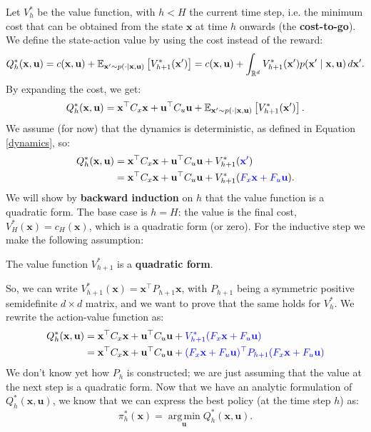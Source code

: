 \documentclass[10pt, a4paper]{report}
\begin{document}
Let $V^*_h$ be the value function, with $h<H$ the current time step, i.e. the minimum cost that can be obtained from the state $\mathbf x$ at time $h$ onwards (the \textbf{cost-to-go}). We define the state-action value by using the cost instead of the reward:\begin{equation}
    Q_h^*(\mathbf x,\mathbf u)=c(\mathbf x,\mathbf u)+{\mathbb E}_{\mathbf x'\sim p(\cdot\mid\mathbf x,\mathbf u)}\left[V_{h+1}^*(\mathbf x')\right]=
    c(\mathbf x,\mathbf u)+\int_{{\mathbb R}^d}V_{h+1}^*(\mathbf x')p(
        \mathbf x'\mid\mathbf x,\mathbf u
    )\,d\mathbf x'.
\end{equation}
By expanding the cost, we get:\begin{equation}
     Q_h^*(\mathbf x,\mathbf u)=\mathbf x^\top C_x\mathbf x+
    \mathbf u^\top C_u\mathbf u+{\mathbb E}_{\mathbf x'\sim p(\cdot\mid\mathbf x,\mathbf u)}\left[V_{h+1}^*(\mathbf x')\right].
\end{equation}
We assume (for now) that the dynamics is deterministic, as defined in Equation \eqref{dynamics}, so:\begin{align}
     Q_h^*(\mathbf x,\mathbf u)&=\mathbf x^\top C_x\mathbf x+
    \mathbf u^\top C_u\mathbf u+V_{h+1}^*(\color{blue}\mathbf x'\color{black})\\
    &=\mathbf x^\top C_x\mathbf x+
    \mathbf u^\top C_u\mathbf u+V_{h+1}^*(\color{blue}F_x\mathbf x+F_u\mathbf u\color{black}).
\end{align}
We will show by \textbf{backward induction} on $h$ that the value function is a quadratic form. The base case is $h=H$: the value is the final cost, $V_H^*(\mathbf x)=c_H(\mathbf x)$, which is a quadratic form (or zero). For the inductive step we make the following assumption:\begin{center}
    The value function $V^*_{h+1}$ is a \textbf{quadratic form}.
\end{center}
So, we can write $V_{h+1}^*(\mathbf x)=\mathbf x^\top P_{h+1}\mathbf x$, with $P_{h+1}$ being a symmetric positive semidefinite $d\times d$ matrix, and we want to prove that the same holds for $V_h^*$. We rewrite the action-value function as:
\begin{align}
     Q_h^*(\mathbf x,\mathbf u)&=\mathbf x^\top C_x\mathbf x+
    \mathbf u^\top C_u\mathbf u+\color{blue}V_{h+1}^*(F_x\mathbf x+F_u\mathbf u)\color{black}\\
 &=\mathbf x^\top C_x\mathbf x+
    \mathbf u^\top C_u\mathbf u+\color{blue}(F_x\mathbf x+F_u\mathbf u)^\top P_{h+1}(F_x\mathbf x+F_u\mathbf u)\color{black}\label{Q_h_star}
\end{align}
We don't know yet how $P_h$ is constructed; we are just assuming that the value at the next step is a quadratic form. Now that we have an analytic formulation of $Q_h^*(\mathbf x,\mathbf u)$, we know that we can express the best policy (at the time step $h$) as:\begin{equation}
    \pi_h^*(\mathbf x)=\operatorname*{arg\,min}_{\mathbf u}Q_h^*(\mathbf x,\mathbf u).
\end{equation}
\end{document}
